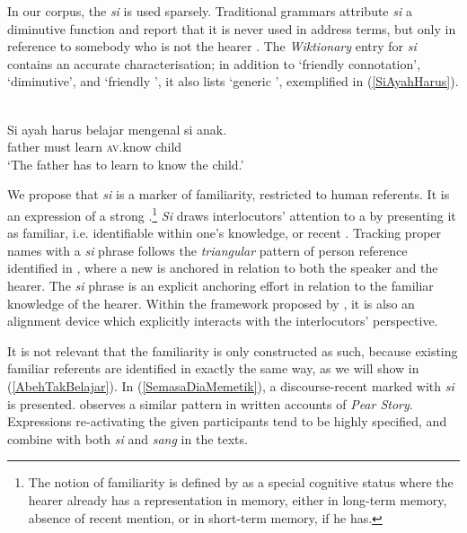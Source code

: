\documentclass[output=paper
,modfonts
,nonflat]{langsci/langscibook}
\begin{document}
\noindent
In our corpus, the  \emph{si} is used sparsely. Traditional grammars attribute \emph{si} a diminutive function \citep[146]{Sneddon2012} and report that it is never used in address terms, but only in reference to somebody who is not the hearer \citep[374]{Sneddon2012}. The \emph{Wiktionary} entry for \emph{si} contains an accurate characterisation; in addition to  `friendly connotation', `diminutive', and `friendly ', it also lists `generic ', exemplified in (\ref{SiAyahHarus}).

\ea\label{SiAyahHarus} 
\\
\gll  {\ob}Si ayah{\cb} harus belajar mengenal  {\ob}si anak{\cb}.\\
\textsc{} father must learn \textsc{av.}know \textsc{} child\\
\glt `The father has to learn to know the child.'
\z

\noindent
We propose that \emph{si} is a marker of familiarity, restricted to human referents. It is an expression of a strong .\footnote{The notion of familiarity is defined by \cite[278]{Gundel1993} as a special cognitive status where the hearer already has a representation in memory, either in long-term memory, absence of recent mention, or in short-term memory, if he has.} \emph{Si} draws interlocutors' attention to a  by presenting it as familiar, i.e. identifiable within one's knowledge, or recent . Tracking proper names with a \emph{si} phrase follows the \emph{triangular} pattern of person reference identified in \citep[229--230]{Haviland2007}, where a new  is anchored in relation to both the speaker and the hearer. The \emph{si} phrase is an explicit anchoring effort in relation to the familiar knowledge of the hearer. Within the  framework proposed by  \cite{DuBois2007}, it is also an alignment device which explicitly interacts with the interlocutors' perspective.

It is not relevant that the familiarity is only constructed as such, because existing familiar referents are identified in exactly the same way, as we will show in (\ref{AbehTakBelajar}). In (\ref{SemasaDiaMemetik}), a discourse-recent  marked with \emph{si} is presented. \cite{Sukamto2013} observes a similar pattern in written  accounts of \emph{Pear Story}. Expressions re-activating the given participants tend to be highly specified, and combine with both \emph{si} and \emph{sang} in the  texts. 
\end{document}
